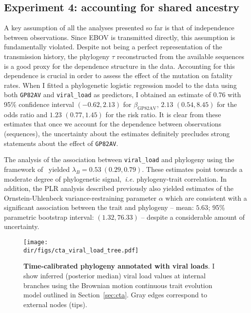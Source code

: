 \subsection*{Experiment 4: accounting for shared ancestry}
\label{sec:results-phylo}

A key assumption of all the analyses presented so far is that of independence between observations.
Since EBOV is transmitted directly, this assumption is fundamentally violated.
Despite not being a perfect representation of the transmission history, the phylogeny $\tau$ reconstructed from the available sequences is a good proxy for the dependence structure in the data.
Accounting for this dependence is crucial in order to assess the effect of the mutation on fatality rates.
When I fitted a phylogenetic logistic regression model to the data using both \verb|GP82AV| and \verb|viral_load| as predictors, I obtained an estimate of $0.76$ with 95\% confidence interval $(-0.62, 2.13)$ for $\beta_{\text{GP82AV}}$, $2.13$ $(0.54, 8.45)$ for the odds ratio and $1.23$ $(0.77, 1.45)$ for the risk ratio.
It is clear from these estimates that once we account for the dependence between observations (sequences), the uncertainty about the estimates definitely precludes strong statements about the effect of \verb|GP82AV|.

The analysis of the association between \verb|viral_load| and phylogeny using the framework of~\cite{Vrancken2015} yielded $\lambda_B = 0.53 \: (0.29, 0.79)$.
These estimates point towards a moderate degree of phylogenetic signal,~\textit{i.e.} phylogeny-trait correlation.
In addition, the PLR analysis described previously also yielded estimates of the Ornstein-Uhlenbeck variance-restraining parameter $\alpha$ which are consistent with a significant association between the trait and phylogeny -- mean: $5.63$; 95\% parametric bootstrap interval: $(1.32, 76.33)$ -- despite a considerable amount of uncertainty.

\begin{figure}[!ht]
  \centering
  \texttt{[image: \\dir/figs/cta\_viral\_load\_tree.pdf]}
\caption[Time-calibrated phylogeny annotated with viral loads.]{\textbf{Time-calibrated phylogeny annotated with viral loads}.
I show inferred (posterior median) viral load values at internal branches using the Brownian motion continuous trait evolution model outlined in Section~\ref{sec:cta}.
Gray edges correspond to external nodes (tips).
}
\label{fig:CTAtree}
\end{figure}

